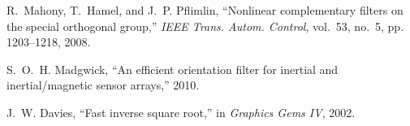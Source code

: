 \documentclass[12pt]{article}
\begin{document}
\begin{thebibliography}{9}
R.~Mahony, T.~Hamel, and J.~P. Pflimlin, “Nonlinear complementary filters on the special orthogonal group,” \emph{IEEE Trans. Autom. Control}, vol.~53, no.~5, pp. 1203–1218, 2008.

S.~O.~H. Madgwick, “An efficient orientation filter for inertial and inertial/magnetic sensor arrays,” 2010.

J.~W. Davies, “Fast inverse square root,” in \emph{Graphics Gems IV}, 2002.

\end{thebibliography}
\end{document}
